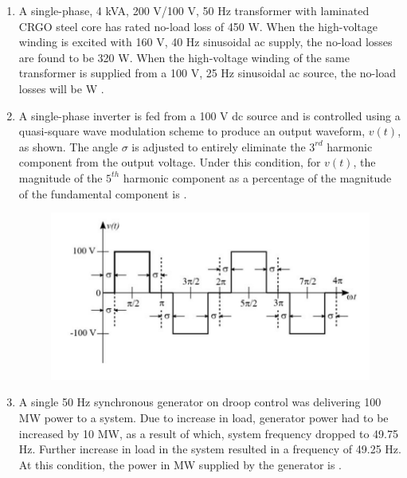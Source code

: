 \documentclass[journal,12pt,onecolumn]{IEEEtran}
\theoremstyle{remark}
\begin{document}
\begin{enumerate}[start=1, label=Q.\arabic*]
\item A single-phase, 4 kVA, 200 V/100 V, 50 Hz transformer with laminated CRGO steel core has rated no-load loss of 450 W. When the high-voltage winding is excited with 160 V, 40 Hz sinusoidal ac supply, the no-load losses are found to be 320 W. When the high-voltage winding of the same transformer is supplied from a 100 V, 25 Hz sinusoidal ac source, the no-load losses will be \underline{\hspace{2cm}} W .

\hfill{}

\item A single-phase inverter is fed from a 100 V dc source and is controlled using a quasi-square wave modulation scheme to produce an output waveform, $v(t)$, as shown. The angle $\sigma$ is adjusted to entirely eliminate the $3^{rd}$ harmonic component from the output voltage. Under this condition, for $v(t)$, the magnitude of the $5^{th}$ harmonic component as a percentage of the magnitude of the fundamental component is \underline{\hspace{2cm}} .
\begin{figure}[H]
    \centering
    \includegraphics[width=0.7\columnwidth]{Figures/b32.png}
    \caption{}
\end{figure}

\hfill{}

\item A single 50 Hz synchronous generator on droop control was delivering 100 MW power to a system. Due to increase in load, generator power had to be increased by 10 MW, as a result of which, system frequency dropped to 49.75 Hz. Further increase in load in the system resulted in a frequency of 49.25 Hz. At this condition, the power in MW supplied by the generator is \underline{\hspace{2cm}} .


\end{enumerate}
\end{document}
